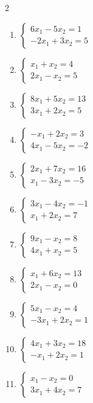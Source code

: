 \begin{multicols}{2}
\begin{enumerate}[label=\arabic*., leftmargin=*]
\item $\begin{cases}6x_1-5x_2=1\\-2x_1+3x_2=5\end{cases}$

\item $\begin{cases}x_1+x_2=4\\2x_1-x_2=5\end{cases}$

\item $\begin{cases}8x_1+5x_2=13\\3x_1+2x_2=5\end{cases}$

\item $\begin{cases}-x_1+2x_2=3\\4x_1-5x_2=-2\end{cases}$

\item $\begin{cases}2x_1+7x_2=16\\x_1-3x_2=-5\end{cases}$

\item $\begin{cases}3x_1-4x_2=-1\\x_1+2x_2=7\end{cases}$

\item $\begin{cases}9x_1-x_2=8\\4x_1+x_2=5\end{cases}$

\item $\begin{cases}x_1+6x_2=13\\2x_1-x_2=0\end{cases}$

\item $\begin{cases}5x_1-x_2=4\\-3x_1+2x_2=1\end{cases}$

\item $\begin{cases}4x_1+3x_2=18\\-x_1+2x_2=1\end{cases}$

\item $\begin{cases}x_1-x_2=0\\3x_1+4x_2=7\end{cases}$


\end{enumerate}
\end{multicols}
